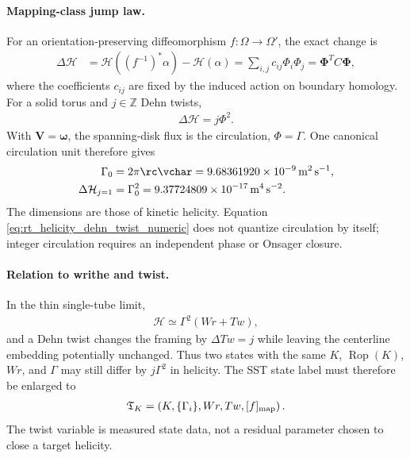 \paragraph{Mapping-class jump law.}
For an orientation-preserving diffeomorphism $f:\Omega\to\Omega'$, the exact
change is
\begin{align}
    \Delta\mathcal H
    &=
    \mathcal H\!\left((f^{-1})^*\alpha\right)-\mathcal H(\alpha)
    =
    \sum_{i,j}c_{ij}\Phi_i\Phi_j
    =
    \boldsymbol\Phi^{\!T}C\boldsymbol\Phi,
    \label{eq:rt_helicity_mapping_class_quadratic}
\end{align}
where the coefficients $c_{ij}$ are fixed by the induced action on boundary
homology.  For a solid torus and $j\in\mathbb Z$ Dehn twists,
\begin{align}
    \Delta\mathcal H=j\Phi^2 .
    \label{eq:rt_helicity_dehn_twist_jump}
\end{align}
With $\mathbf V=\boldsymbol\omega$, the spanning-disk flux is the circulation,
$\Phi=\Gamma$.  One canonical circulation unit therefore gives
\begin{align}
    \Gamma_0
    &=2\pi\rc\vchar
      =9.68361920\times10^{-9}\,{\rm m^2\,s^{-1}},\\
    \Delta\mathcal H_{j=1}
    &=\Gamma_0^2
      =9.37724809\times10^{-17}\,{\rm m^4\,s^{-2}}.
    \label{eq:rt_helicity_dehn_twist_numeric}
\end{align}
The dimensions are those of kinetic helicity.  Equation
\eqref{eq:rt_helicity_dehn_twist_numeric} does not quantize circulation by
itself; integer circulation requires an independent phase or Onsager closure.

\paragraph{Relation to writhe and twist.}
In the thin single-tube limit,
\begin{align}
    \mathcal H\simeq\Gamma^2(Wr+Tw),
    \label{eq:rt_helicity_wr_tw_sector}
\end{align}
and a Dehn twist changes the framing by $\Delta Tw=j$ while leaving the
centerline embedding potentially unchanged.  Thus two states with the same
$K$, $\operatorname{Rop}(K)$, $Wr$, and $\Gamma$ may still differ by
$j\Gamma^2$ in helicity.  The SST state label must therefore be enlarged to
\begin{align}
    \mathfrak T_K
    =
    \left(K,\{\Gamma_i\},Wr,Tw,[f]_{\rm map}\right).
    \label{eq:rt_helicity_state_label}
\end{align}
The twist variable is measured state data, not a residual parameter chosen to
close a target helicity.

